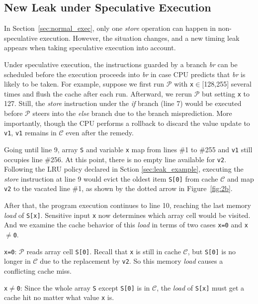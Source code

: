 \documentclass[sigconf]{acmart}
\newcommand{\prog}{\mathcal{P}}
\begin{document}
\subsection{New Leak under Speculative Execution}
\label{sec:specu_leak}

In Section~\ref{sec:normal_exec}, only one \textit{store} operation can happen 
in non-speculative execution. However, the situation changes, and a new timing 
leak appears when taking speculative execution into account.  


Under speculative execution, the instructions guarded by a branch \emph{br} can 
be scheduled before the execution proceeds into \emph{br} in case CPU predicts 
that \emph{br} is likely to be taken. For example, suppose we first run $\prog$ 
with \texttt{x}$\in$[128,255] several times and flush the cache after each run. 
Afterward, we rerun $\prog$ but setting \texttt{x} to 127. Still, the 
\textit{store} instruction under the \emph{if} branch (line 7) would be executed 
before $\prog$ steers into the \emph{else} branch due to the branch misprediction. 
More importantly, though the CPU performs a rollback to discard the value update 
to \texttt{v1}, \texttt{v1} remains in $\mathcal{C}$ even after the remedy. 


Going until line 9, array \texttt{S} and variable \texttt{x} map from lines \#1 
to \#255 and \texttt{v1} still occupies line \#256. At this point, there is no 
empty line available for \texttt{v2}. Following the LRU policy declared in Sction
\ref{sec:leak_example}, executing the \textit{store} instruction at line 9 would 
evict the oldest item \texttt{S[0]} from cache $\mathcal{C}$ and map \texttt{v2} 
to the vacated line \#1, as shown by the dotted arrow in Figure~\ref{fig:2b}.


After that, the program execution continues to line 10, reaching the last memory 
\textit{load} of \texttt{S[x]}. Sensitive input \texttt{x} now determines which 
array cell would be visited. And we examine the cache behavior of this \textit{load} 
in terms of two cases \texttt{x=0} and \texttt{x$\neq$0}.


\begin{itemize*}
  \item \texttt{x=0}: $\prog$ reads array cell \texttt{S[0]}. Recall that \texttt{x} 
	is still in cache $\mathcal{C}$, but \texttt{S[0]} is no longer in $\mathcal{C}$ 
	due to the replacement by \texttt{v2}. So this memory \textit{load}	causes a 
	conflicting cache miss.
  \item \texttt{x$\neq$0}: Since the whole array \texttt{S} except \texttt{S[0]}
    is in $\mathcal{C}$, the \textit{load} of \texttt{S[x]} must get a cache hit 
		no matter what value \texttt{x} is.
\end{itemize*}
\end{document}
